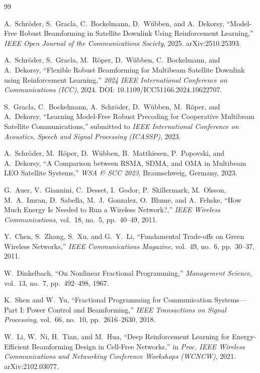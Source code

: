 \documentclass[11pt]{article}
\begin{document}
\begin{thebibliography}{99}

A.~Schr\"oder, S.~Gracla, C.~Bockelmann, D.~W\"ubben, and A.~Dekorsy,
``Model-Free Robust Beamforming in Satellite Downlink Using Reinforcement
Learning,'' \emph{IEEE Open Journal of the Communications Society}, 2025.
arXiv:2510.25393.

A.~Schr\"oder, S.~Gracla, M.~R\"oper, D.~W\"ubben, C.~Bockelmann, and
A.~Dekorsy, ``Flexible Robust Beamforming for Multibeam Satellite Downlink
using Reinforcement Learning,'' \emph{2024 IEEE International Conference on
Communications (ICC)}, 2024. DOI: 10.1109/ICC51166.2024.10622707.

S.~Gracla, C.~Bockelmann, A.~Schr\"oder, D.~W\"ubben, M.~R\"oper, and
A.~Dekorsy, ``Learning Model-Free Robust Precoding for Cooperative
Multibeam Satellite Communications,'' submitted to \emph{IEEE International
Conference on Acoustics, Speech and Signal Processing (ICASSP)}, 2023.

A.~Schr\"oder, M.~R\"oper, D.~W\"ubben, B.~Matthiesen, P.~Popovski, and
A.~Dekorsy, ``A Comparison between RSMA, SDMA, and OMA in Multibeam LEO
Satellite Systems,'' \emph{WSA \& SCC 2023}, Braunschweig, Germany, 2023.

G.~Auer, V.~Giannini, C.~Desset, I.~Godor, P.~Skillermark, M.~Olsson,
M.~A.~Imran, D.~Sabella, M.~J.~Gonzalez, O.~Blume, and A.~Fehske, ``How Much
Energy Is Needed to Run a Wireless Network?,'' \emph{IEEE Wireless
Communications}, vol.~18, no.~5, pp.~40--49, 2011.

Y.~Chen, S.~Zhang, S.~Xu, and G.~Y.~Li, ``Fundamental Trade-offs on Green
Wireless Networks,'' \emph{IEEE Communications Magazine}, vol.~49, no.~6,
pp.~30--37, 2011.

W.~Dinkelbach, ``On Nonlinear Fractional Programming,'' \emph{Management
Science}, vol.~13, no.~7, pp.~492--498, 1967.

K.~Shen and W.~Yu, ``Fractional Programming for Communication
Systems---Part I: Power Control and Beamforming,'' \emph{IEEE Transactions
on Signal Processing}, vol.~66, no.~10, pp.~2616--2630, 2018.

W.~Li, W.~Ni, H.~Tian, and M.~Hua, ``Deep Reinforcement Learning for
Energy-Efficient Beamforming Design in Cell-Free Networks,'' in \emph{Proc.
IEEE Wireless Communications and Networking Conference Workshops
(WCNCW)}, 2021. arXiv:2102.03077.


\end{thebibliography}
\end{document}
